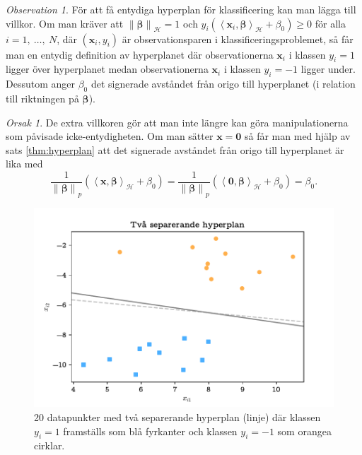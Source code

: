 \documentclass[a4paper, 12pt]{report}
\theoremstyle{definition}
\theoremstyle{remark}
\newtheorem*{rem}{Observation}
\newtheorem*{reas}{Orsak}
\newcommand{\bfbeta}{{\boldsymbol{\beta}}}
\newcommand{\bfx}{\mathbf{x}}
\newcommand{\llangle}{\left\langle}
\newcommand{\rrangle}{\right\rangle}
\newcommand{\inner}[2]{\llangle #1, #2 \rrangle}
\newcommand{\hil}{\mathcal{H}}
\begin{document}
\begin{rem}
	För att få entydiga hyperplan för klassificering kan man lägga till villkor. Om man kräver att $\left\|\bfbeta\right\|_\hil=1$ och $y_i\left(\inner{\bfx_i}{\bfbeta}_\hil + \beta_0\right)\geq0$ för alla $i=1,~\dots,~N$, där $\left(\bfx_i, y_i\right)$ är observationsparen i klassificeringsproblemet, så får man en entydig definition av hyperplanet där observationerna $\bfx_i$ i klassen $y_i=1$ ligger över hyperplanet medan observationerna $\bfx_i$ i klassen $y_i=-1$ ligger under.
	Dessutom anger $\beta_0$ det signerade avståndet från origo till hyperplanet (i relation till riktningen på $\bfbeta$).
\end{rem}
\begin{reas}
	De extra villkoren gör att man inte längre kan göra manipulationerna som påvisade icke-entydigheten. Om man sätter $\mathbf{x}=\mathbf{0}$ så får man med hjälp av sats \ref{thm:hyperplan} att det signerade avståndet från origo till hyperplanet är lika med
	\begin{equation*}
	\frac{1}{\left\|\bfbeta
\right\|_p}\left(\inner{\bfx}{\bfbeta}_\hil+\beta_0\right)=\frac{1}{\left\|\bfbeta
\right\|_p}\left(\inner{\mathbf{0}}{\bfbeta}_\hil+\beta_0\right)=\beta_0.
	\end{equation*}
\end{reas}

\begin{figure}[h]
\centering
\includegraphics[width=0.8\linewidth, trim={0.5cm 2mm 0.5cm 6mm}, clip]{KandFigur1.pdf}
\caption{\label{fig:separatinghyperplane}20 datapunkter med två separerande hyperplan (linje) där klassen $y_i=1$ framställs som blå fyrkanter och klassen $y_i=-1$ som orangea cirklar.}
\end{figure}
\end{document}
